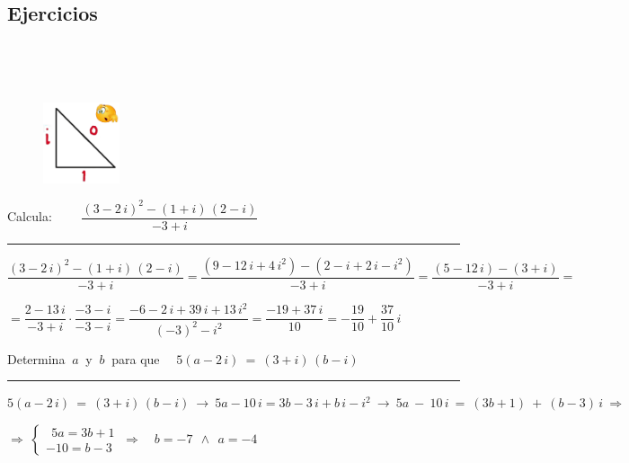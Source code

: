 \vspace{2cm}
\begin{multicols}{2}
\section{Ejercicios}

$\quad$

\vspace{5mm} $\quad$

\begin{figure}[H]
	\centering
	\includegraphics[width=0.2\textwidth]{img-c/comp07.png}
\end{figure}
\end{multicols}
\vspace{0.5cm}

\begin{miejercicio}

Calcula: $\qquad \dfrac{(3-2\, i)^2 - (1+i)\, (2-i)}{-3+i}$

\rule{250pt}{0.5pt}

\vspace{4mm} $\dfrac{(3-2\, i)^2 - (1+i)\, (2-i)}{-3+i}= \dfrac{(9-12\, i+4\, i^2 )- (2-i+2\, i-i^2)}{-3+i}= \dfrac{(5-12\, i)-(3+i)}{-3+i}=$

\vspace{2mm} $=\dfrac{2-13\, i}{-3+i}\cdot \dfrac{-3-i}{-3-i}=\dfrac{-6-2\, i +39\, i +13\, i^2}{(-3)^2-i^2}=\dfrac{-19+37\, i}{10}=-\dfrac{19}{10}+\dfrac{37}{10}\, i$


\end{miejercicio}

\begin{miejercicio}

Determina $\ a \ $ y $\ b \ $ para que $\quad 5(a-2\, i)\ = \ (3+i)\, (b-i)$

\rule{250pt}{0.5pt}

\vspace{2mm} $ 5(a-2\, i)\ = \ (3+i)\, (b-i) \ \to \ 5a-10\, i=3b-3\, i +b\, i -i^2 \ \to \ 5a\ -\ 10\, i \ = \ (3b+1) \ + \ (b-3)\, i\ \Rightarrow$

\vspace{2mm} $\Rightarrow \ \begin{cases} \ \ 5a = 3b+1 \\ -10 = b-3 \end{cases} \ \Rightarrow \quad  b=-7 \ \ \wedge \ \ a=-4$

\end{miejercicio}

